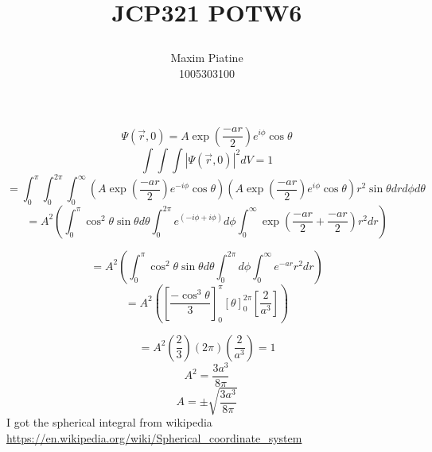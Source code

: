 \documentclass[11pt]{article}
\title{\textbf{JCP321 POTW6}
\author{Maxim Piatine\\1005303100}}
\date{}
\begin{document}
\maketitle
\[\Psi(\Vec{r},0)=A\exp\left(\frac{-ar}{2}\right)e^{i\phi}\cos{\theta}\]
\[\int \int \int |\Psi(\Vec{r},0)|^2dV=1\]
\[=\int^\pi_0\int^{2\pi}_0\int^\infty_0 \left(A\exp\left(\frac{-ar}{2}\right)e^{-i\phi}\cos{\theta}\right)
\left(A\exp\left(\frac{-ar}{2}\right)e^{i\phi}\cos{\theta}\right)r^2\sin{\theta}drd\phi d\theta\]
\[=A^2\left(
\int^\pi_0 \cos^2{\theta}\sin{\theta}d\theta
\int^{2\pi}_0 e^{(-i\phi+i\phi)} d\phi 
\int^\infty_0 \exp{\left( \frac{-ar}{2} + \frac{-ar}{2}\right)}r^2dr
\right)\]

\[=A^2\left(
\int^\pi_0 \cos^2{\theta}\sin{\theta}d\theta
\int^{2\pi}_0 d\phi 
\int^\infty_0 e^{-ar}r^2dr
\right)\]
\[=A^2\left(\left[
\frac{-\cos^3{\theta}}{3}\right]^\pi_0
\left[\theta\right]^{2\pi}_0
\left[\frac{2}{a^3}\right]\right)\]

\[=A^2\left(\frac{2}{3}\right)(2\pi)\left(\frac{2}{a^3}\right)=1\]
\[A^2=\frac{3a^3}{8\pi}\]
\[A=\pm\sqrt{\frac{3a^3}{8\pi}}\]
I got the spherical integral from wikipedia 
\\\url{https://en.wikipedia.org/wiki/Spherical_coordinate_system}
\end{document}
